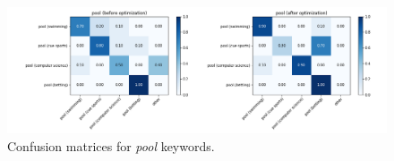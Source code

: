 \documentclass{llncs}
\begin{document}
\begin{figure}
    \centering
    \caption{Confusion matrices for \textit{pool} keywords.}
    \label{fig:cm_pool}
    \includegraphics[scale=0.38]{res/cm_pool.png}
\end{figure}
\end{document}
